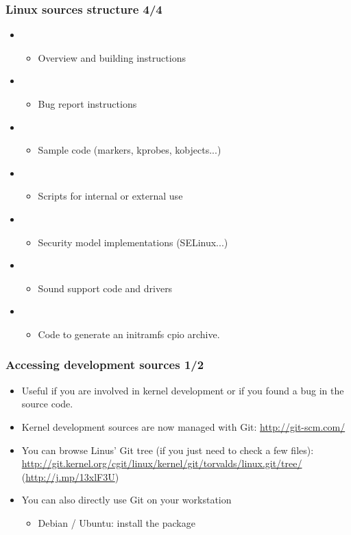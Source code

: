 \begin{frame}
  \frametitle{Linux sources structure 4/4}
  \begin{itemize}
  \item {}
    \begin{itemize}
    \item Overview and building instructions
    \end{itemize}
  \item {}
    \begin{itemize}
    \item Bug report instructions
    \end{itemize}
  \item {}
    \begin{itemize}
    \item Sample code (markers, kprobes, kobjects...)
    \end{itemize}
  \item {}
    \begin{itemize}
    \item Scripts for internal or external use
    \end{itemize}
  \item {}
    \begin{itemize}
    \item Security model implementations (SELinux...)
    \end{itemize}
  \item {}
    \begin{itemize}
    \item Sound support code and drivers
    \end{itemize}
  \item {}
    \begin{itemize}
    \item Code to generate an initramfs cpio archive.
    \end{itemize}
  \end{itemize}
\end{frame}

\begin{frame}
  \frametitle{Accessing development sources 1/2}
  \begin{itemize}
  \item Useful if you are involved in kernel development or if you
    found a bug in the source code.
  \item Kernel development sources are now managed with Git:
    \url{http://git-scm.com/}
  \item You can browse Linus' Git tree (if you just need to check a
    few files):
    \url{http://git.kernel.org/cgit/linux/kernel/git/torvalds/linux.git/tree/}
    (\url{http://j.mp/13xlF3U})
  \item You can also directly use Git on your workstation
    \begin{itemize}
    \item Debian / Ubuntu: install the  package
    \end{itemize}
  \end{itemize}
\end{frame}

